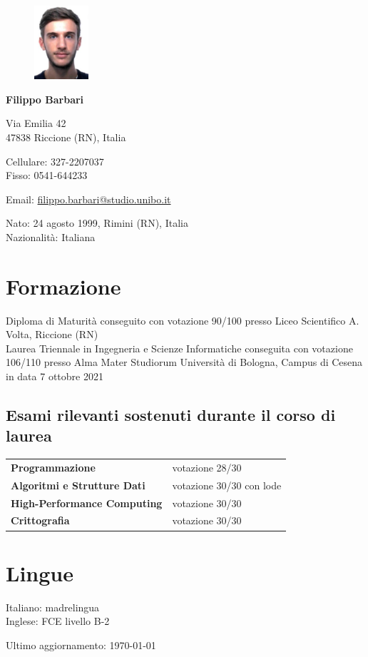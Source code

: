 \documentclass{article}
\newcommand{\years}[1]{\marginnote{\small #1}} %
\begin{document}
	
	\begin{figure}
		\includegraphics[width=0.18\textwidth]{fototessera}
	\end{figure}
		
	{\LARGE\bfseries Filippo Barbari} %
	\bigskip\bigskip\medskip %
	
	Via Emilia 42\\ %
	47838 Riccione (RN), Italia
	\medskip %
	
	Cellulare: 327-2207037\\
	Fisso: 0541-644233
	\medskip
	
	Email: \href{mailto:filippo.barbari@studio.unibo.it}{filippo.barbari@studio.unibo.it}
	\medskip
	
	Nato: 24 agosto 1999, Rimini (RN), Italia\\ %
	Nazionalità: Italiana %
	
	\section*{Formazione}
	
	\years{2013-2018} Diploma di Maturità conseguito con votazione 90/100 presso Liceo Scientifico A. Volta, Riccione (RN)\\
	\years{2018-2021} Laurea Triennale in Ingegneria e Scienze Informatiche conseguita con votazione 106/110 presso Alma Mater Studiorum Università di Bologna, Campus di Cesena in data 7 ottobre 2021
	
	\subsection*{Esami rilevanti sostenuti durante il corso di laurea}
	
	\begin{tabular}{ll}
		\textbf{Programmazione} & votazione 28/30\\
		\textbf{Algoritmi e Strutture Dati} & votazione 30/30 con lode\\
		\textbf{High-Performance Computing} & votazione 30/30\\
		\textbf{Crittografia} & votazione 30/30
	\end{tabular}
	
	\section*{Lingue}
	
	Italiano: madrelingua\\
	Inglese: FCE livello B-2
	
	\begin{center}
		\scriptsize
		Ultimo aggiornamento: \today
	\end{center}
	
\end{document}
